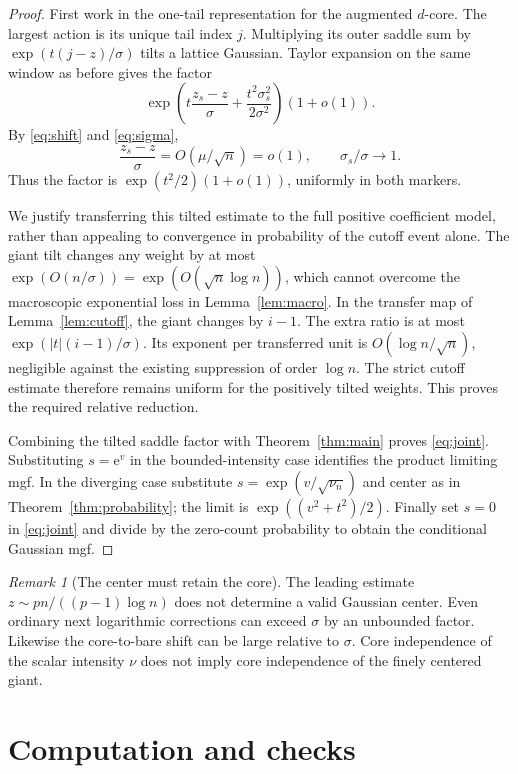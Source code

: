 \documentclass[11pt,a4paper]{article}
\numberwithin{equation}{section}
\theoremstyle{definition}
\theoremstyle{remark}
\newtheorem{remark}[theorem]{Remark}
\newcommand{\ee}{\mathrm e}\newcommand{\dd}{\mathrm d}
\begin{document}
\begin{proof}
First work in the one-tail representation for the augmented $d$-core. The
largest action is its unique tail index $j$. Multiplying its outer saddle
sum by $\exp(t(j-z)/\sigma)$ tilts a lattice Gaussian. Taylor expansion
on the same window as before gives the factor
\[
 \exp\left(t\frac{z_s-z}{\sigma}
              +\frac{t^2\sigma_s^2}{2\sigma^2}\right)(1+o(1)).
\]
By \eqref{eq:shift} and \eqref{eq:sigma},
\[
 \frac{z_s-z}{\sigma}=O(\mu/\sqrt n)=o(1),\qquad
 \sigma_s/\sigma\to1.
\]
Thus the factor is $\exp(t^2/2)(1+o(1))$, uniformly in both markers.

We justify transferring this tilted estimate to the full positive
coefficient model, rather than appealing to convergence in probability of
the cutoff event alone. The giant tilt changes any weight by at most
$\exp(O(n/\sigma))=\exp(O(\sqrt n\log n))$, which cannot overcome the
macroscopic exponential loss in Lemma~\ref{lem:macro}. In the transfer map
of Lemma~\ref{lem:cutoff}, the giant changes by $i-1$. The extra ratio is
at most $\exp(|t|(i-1)/\sigma)$. Its exponent per transferred unit is
$O(\log n/\sqrt n)$, negligible against the existing suppression of order
$\log n$. The strict cutoff estimate therefore remains uniform for the
positively tilted weights. This proves the required relative reduction.

Combining the tilted saddle factor with Theorem~\ref{thm:main} proves
\eqref{eq:joint}. Substituting $s=\ee^v$ in the bounded-intensity case
identifies the product limiting mgf. In the diverging case substitute
$s=\exp(v/\sqrt{\nu_n})$ and center as in
Theorem~\ref{thm:probability}; the limit is
$\exp((v^2+t^2)/2)$. Finally set $s=0$ in \eqref{eq:joint} and divide by
the zero-count probability to obtain the conditional Gaussian mgf.
\end{proof}

\begin{remark}[The center must retain the core]
The leading estimate $z\sim pn/((p-1)\log n)$ does not determine a valid
Gaussian center. Even ordinary next logarithmic corrections can exceed
$\sigma$ by an unbounded factor. Likewise the core-to-bare shift can be
large relative to $\sigma$. Core independence of the scalar intensity
$\nu$ does not imply core independence of the finely centered giant.
\end{remark}

\section{Computation and checks}
\label{sec:checks}
\end{document}
